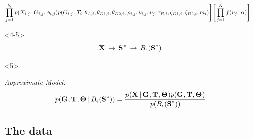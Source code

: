 \begin{frame}[t]
\begin{onlyenv}
\begin{displaybox}
{\begin{equation*}
\begin{split}
        &
        \prod_{j=1}^{\nloci{i}}
        p(\alignment{i}{j} \given
        \geneTree{i}{j}, \hkyModel{i}{j})
        p(\geneTree{i}{j} \given
        \divTimeMap{i},
        \ancestralTheta{i}, \descendantTheta{1}{i}, \descendantTheta{2}{i},
        \ploidyScalar{i}{j}, \mutationRateScalarConstant{i}{j},
        \locusMutationRateScalar{j},
        \bottleTime{i}, \bottleScalar{1}{i}, \bottleScalar{2}{i},
        \migrationRate{i})
        \Bigg]
        \Bigg[
        \prod_{j=1}^{\nlociTotal}
        f(\locusMutationRateScalar{j} \given \locusRateHetShapeParameter)
        \Bigg]
        \label{eq:fullmodel}
        \end{split}
    \end{equation*}
    }
    \end{displaybox}
    \end{onlyenv}
    \begin{onlyenv}<4-5>
    \smallskip
        \[ \alignmentVector \, \to \, \ssVectorObs \, \to \, \ssSpace\]
    \end{onlyenv}
    \begin{onlyenv}<5>
    \begin{block}{\it Approximate Model:}
    \[
        p(\geneTreeVector, \divTimeMapVector, \demographicParamVector
        \given
        \ssSpace) =
        \frac{p(\alignmentVector \given \geneTreeVector, \divTimeMapVector,
        \demographicParamVector)
        p(\geneTreeVector, \divTimeMapVector, \demographicParamVector)}{
        p(\ssSpace)}
    \]\vspace{0mm}
    \end{block}
    \end{onlyenv}
\end{frame}

\subsection{The data}

